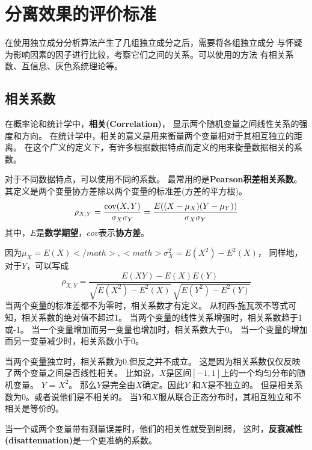 ﻿%

\chapter{分离效果的评价标准}

\label{chap03}

在使用独立成分分析算法产生了几组独立成分之后，需要将各组独立成分
与怀疑为影响因素的因子进行比较，考察它们之间的关系。可以使用的方法
有相关系数、互信息、灰色系统理论等。
 
\section{相关系数}
在概率论和统计学中，\textbf{相关(Correlation)}，
显示两个随机变量之间线性关系的强度和方向。
在统计学中，相关的意义是用来衡量两个变量相对于其相互独立的距离。
在这个广义的定义下，有许多根据数据特点而定义的用来衡量数据相关的系数。

对于不同数据特点，可以使用不同的系数。
最常用的是\textbf{Pearson积差相关系数}。
其定义是两个变量协方差除以两个变量的标准差(方差的平方根)。
\begin{equation}
\rho_{X,Y} = {\mathrm{cov}(X,Y) \over \sigma_X \sigma_Y} 
           = {E((X-\mu_X)(Y-\mu_Y)) \over \sigma_X\sigma_Y}
\end{equation}
其中，$E$是\textbf{数学期望}，$cov$表示\textbf{协方差}。

因为$\mu_X = E(X)</math>, <math>\sigma_X^2 = E(X^2) - E^2(X)$，
同样地，对于$Y$，可以写成
\begin{equation}
\rho_{X,Y} = 
       \frac{E(XY)-E(X)E(Y)}
            {\sqrt{E(X^2)-E^2(X)}~\sqrt{E(Y^2)-E^2(Y)}}
\end{equation}
当两个变量的标准差都不为零时，相关系数才有定义。
从柯西-施瓦茨不等式可知，相关系数的绝对值不超过1。
当两个变量的线性关系增强时，相关系数趋于1或-1。
当一个变量增加而另一变量也增加时，相关系数大于0。
当一个变量的增加而另一变量减少时，相关系数小于0。

当两个变量独立时，相关系数为0.但反之并不成立。 
这是因为相关系数仅仅反映了两个变量之间是否线性相关。
比如说，$X$是区间$[-1, 1]$上的一个均匀分布的随机变量。
$Y$ = $X^2$。 那么$Y$是完全由$X$确定。因此$Y$ 和$X$是不独立的。
但是相关系数为0。或者说他们是不相关的。
当$Y$和$X$服从联合正态分布时，其相互独立和不相关是等价的。

当一个或两个变量带有测量误差时，他们的相关性就受到削弱，
这时，\textbf{反衰减性(disattenuation)}是一个更准确的系数。



